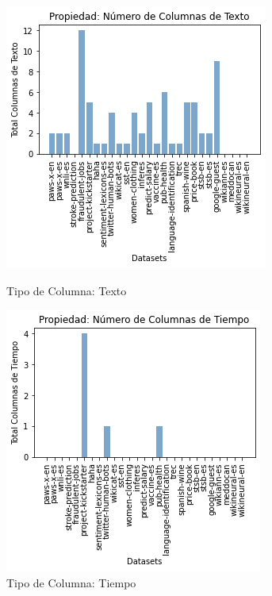 \begin{figure}
  \centering
    \begin{minipage}[b]{0.31\textwidth}
        \centering
        \includegraphics[width=\textwidth]{Graphics/results/columns_t.png}
          \caption{Tipo de Columna: Texto}
          \label{fig:columns-t}
    \end{minipage}      
\hspace{0.03cm}
    \begin{minipage}[b]{0.31\textwidth}
        \centering
        \includegraphics[width=\textwidth]{Graphics/results/columns_d.png}
          \caption{Tipo de Columna: Tiempo}
          \label{fig:columns-d}
        \end{minipage} 
\end{figure}

